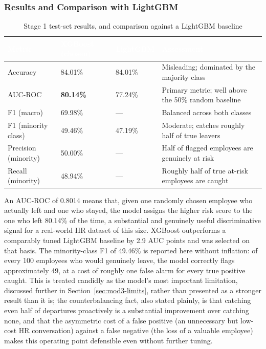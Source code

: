 \documentclass[11pt,a4paper]{article}
\newcommand{\hdrow}{\rowcolor{TPnavy}}
\newcommand{\hdtxt}[1]{\textcolor{white}{\bfseries #1}}
\begin{document}
\subsubsection{Results and Comparison with LightGBM}

\begin{table}[H]
\centering
\caption{Stage 1 test-set results, and comparison against a LightGBM baseline}
\label{tab:mod3-results}
\small
\begin{tabular}{C{2.8cm}C{2.3cm}C{2.0cm}p{6.4cm}}
\toprule
\hdrow \hdtxt{Metric} & \hdtxt{XGBoost (chosen)} & \hdtxt{LightGBM} & \hdtxt{Assessment} \\
\midrule
Accuracy & 84.01\% & 84.01\% & Misleading; dominated by the majority class \\
AUC-ROC & \textbf{80.14\%} & 77.24\% & Primary metric; well above the 50\% random baseline \\
F1 (macro) & 69.98\% & --- & Balanced across both classes \\
F1 (minority class) & 49.46\% & 47.19\% & Moderate; catches roughly half of true leavers \\
Precision (minority) & 50.00\% & --- & Half of flagged employees are genuinely at risk \\
Recall (minority) & 48.94\% & --- & Roughly half of true at-risk employees are caught \\
\bottomrule
\end{tabular}
\end{table}

An AUC-ROC of 0.8014 means that, given one randomly chosen employee who actually left and one who stayed, the model assigns the higher risk score to the one who left 80.14\% of the time, a substantial and genuinely useful discriminative signal for a real-world HR dataset of this size. XGBoost outperforms a comparably tuned LightGBM baseline by 2.9 AUC points and was selected on that basis. The minority-class F1 of 49.46\% is reported here without inflation: of every 100 employees who would genuinely leave, the model correctly flags approximately 49, at a cost of roughly one false alarm for every true positive caught. This is treated candidly as the model's most important limitation, discussed further in Section~\ref{sec:mod3-limits}, rather than presented as a stronger result than it is; the counterbalancing fact, also stated plainly, is that catching even half of departures proactively is a substantial improvement over catching none, and that the asymmetric cost of a false positive (an unnecessary but low-cost HR conversation) against a false negative (the loss of a valuable employee) makes this operating point defensible even without further tuning.
\end{document}
